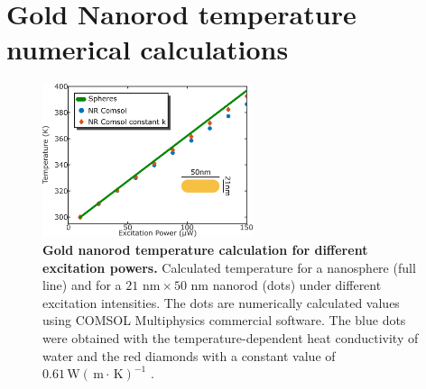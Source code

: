 \documentclass[journal=nalefd,manuscript=letter]{achemso}
\newcommand{\K}{\ensuremath{\,\textrm{K}}}
\newcommand{\nm}{\ensuremath{\,\textrm{nm}}}
\newcommand{\m}{\ensuremath{\,\textrm{m}}}
\newcommand{\W}{\ensuremath{\,\textrm{W}}}
\begin{document}
%
%
%



\pagebreak
\section{Gold Nanorod temperature numerical calculations} \label{sec:temp-calc}

\begin{figure}[htp] \centering
\includegraphics[width=0.55\textwidth]{Figures/Supplementary/04_Compare_Comsol/04_Compare_Comsol.png}
\caption{\textbf{Gold nanorod temperature calculation for different excitation powers.}
Calculated temperature for a nanosphere (full line) and 
for a $21\,\nm\times 50\,\nm$ nanorod (dots) under different excitation intensities. 
The dots are numerically calculated values using COMSOL Multiphysics commercial software. 
The blue dots were obtained with the temperature-dependent heat conductivity of water 
and the red diamonds with a constant value of $0.61 \W(\m\cdot\K)^{-1}$ .}
	\label{fig:Compare-Comsol}
\end{figure}
\end{document}
